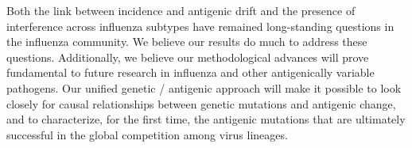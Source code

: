\documentclass[stdletter,letterpaper,addrfromright,orderfromdateto,dateleft,11pt,noaddrto,sigleft]{newlfm}
\begin{document}
\begin{newlfm}
Both the link between incidence and antigenic drift and the presence of interference across influenza subtypes have remained long-standing questions in the influenza community.
We believe our results do much to address these questions.
Additionally, we believe our methodological advances will prove fundamental to future research in influenza and other antigenically variable pathogens.
Our unified genetic / antigenic approach will make it possible to look closely for causal relationships between genetic mutations and antigenic change, and to characterize, for the first time, the antigenic mutations that are ultimately successful in the global competition among virus lineages.

\end{newlfm}
\end{document}
